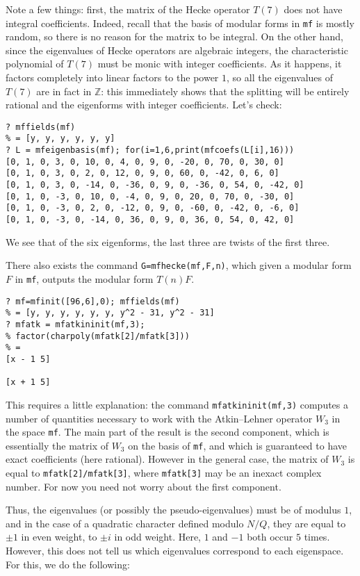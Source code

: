 \documentclass[11pt]{article}
\newcommand{\Z}{{\mathbb Z}}
\def\kbd#1{{\tt #1}}
\begin{document}
Note a few things: first, the matrix of the Hecke operator $T(7)$ does not
have integral coefficients. Indeed, recall that the basis of modular forms
in \kbd{mf} is mostly random, so there is no reason for the matrix to be
integral. On the other hand, since the eigenvalues of Hecke operators are
algebraic integers, the characteristic polynomial of $T(7)$ must be monic
with integer coefficients. As it happens, it factors completely into
linear factors to the power $1$, so all the eigenvalues of $T(7)$ are in
fact in $\Z$: this immediately shows that the splitting will be entirely
rational and the eigenforms with integer coefficients. Let's check:

\begin{verbatim}
? mffields(mf)
% = [y, y, y, y, y, y]
? L = mfeigenbasis(mf); for(i=1,6,print(mfcoefs(L[i],16)))
[0, 1, 0, 3, 0, 10, 0, 4, 0, 9, 0, -20, 0, 70, 0, 30, 0]
[0, 1, 0, 3, 0, 2, 0, 12, 0, 9, 0, 60, 0, -42, 0, 6, 0]
[0, 1, 0, 3, 0, -14, 0, -36, 0, 9, 0, -36, 0, 54, 0, -42, 0]
[0, 1, 0, -3, 0, 10, 0, -4, 0, 9, 0, 20, 0, 70, 0, -30, 0]
[0, 1, 0, -3, 0, 2, 0, -12, 0, 9, 0, -60, 0, -42, 0, -6, 0]
[0, 1, 0, -3, 0, -14, 0, 36, 0, 9, 0, 36, 0, 54, 0, 42, 0]
\end{verbatim}

We see that of the six eigenforms, the last three are twists of the first
three.

There also exists the command \kbd{G=mfhecke(mf,F,n)}, which given a modular
form $F$ in \kbd{mf}, outputs the modular form $T(n)F$.

\begin{verbatim}
? mf=mfinit([96,6],0); mffields(mf)
% = [y, y, y, y, y, y, y^2 - 31, y^2 - 31]
? mfatk = mfatkininit(mf,3);
% factor(charpoly(mfatk[2]/mfatk[3]))
% =
[x - 1 5]

[x + 1 5]
\end{verbatim}

This requires a little explanation: the command \kbd{mfatkininit(mf,3)}
computes a number of quantities necessary to work with the Atkin--Lehner
operator $W_3$ in the space \kbd{mf}. The main part of the result is
the second component, which is essentially the matrix of $W_3$ on the
basis of \kbd{mf}, and which is guaranteed to have exact coefficients
(here rational). However in the general case, the matrix of $W_3$
is equal to \kbd{mfatk[2]/mfatk[3]}, where \kbd{mfatk[3]} may be an
inexact complex number. For now you need not worry about the first component.

Thus, the eigenvalues (or possibly the pseudo-eigenvalues) must be of modulus
$1$, and in the case of a quadratic character defined modulo $N/Q$, they
are equal to $\pm1$ in even weight, to $\pm i$ in odd weight. Here,
$1$ and $-1$ both occur $5$ times. However, this does not tell us which
eigenvalues correspond to each eigenspace. For this, we do the following:
\end{document}
